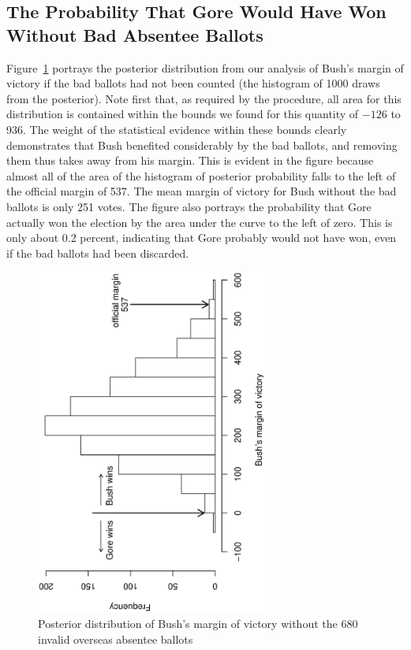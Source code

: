 \documentclass[11pt,titlepage]{article}
\begin{document}
\subsection{The Probability That Gore Would Have Won Without Bad 
Absentee Ballots}

Figure~\ref{fg:margin} portrays the posterior distribution from our
analysis of Bush's margin of victory if the bad ballots had not been
counted (the histogram of 1000 draws from the posterior).  Note first
that, as required by the procedure, all area for this distribution is
contained within the bounds we found for this quantity of $-126$ to
936.  The weight of the statistical evidence within these bounds
clearly demonstrates that Bush benefited considerably by the bad
ballots, and removing them thus takes away from his margin.  This is
evident in the figure because almost all of the area of the histogram
of posterior probability falls to the left of the official margin of
537.  The mean margin of victory for Bush without the bad ballots is
only 251 votes.  The figure also portrays the probability that Gore
actually won the election by the area under the curve to the left of
zero.  This is only about 0.2 percent, indicating that Gore probably
would not have won, even if the bad ballots had been discarded.
\begin{figure}[t]
\begin{center}
\includegraphics[width=3in,height=4.5in,angle=-90]{margin}
\caption{Posterior distribution of Bush's margin of victory without the
  680 invalid overseas absentee ballots} \label{fg:margin}
\end{center} 
\end{figure}
\end{document}

